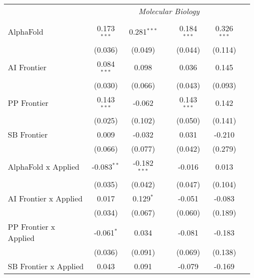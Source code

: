 \begin{tabular}{lcccccc}
 & \multicolumn{6}{c}{\textit{Molecular Biology}} \\ \\
   AlphaFold                      & 0.173$^{***}$ & 0.281$^{***}$  &                & 0.184$^{***}$ & 0.326$^{***}$ &   \\   
                                  & (0.036)       & (0.049)        &                & (0.044)       & (0.114)       &   \\   
   AI Frontier                    & 0.084$^{***}$ & 0.098          &                & 0.036         & 0.145         &   \\   
                                  & (0.030)       & (0.066)        &                & (0.043)       & (0.093)       &   \\   
   PP Frontier                    & 0.143$^{***}$ & -0.062         &                & 0.143$^{***}$ & 0.142         &   \\   
                                  & (0.025)       & (0.102)        &                & (0.050)       & (0.141)       &   \\   
   SB Frontier                    & 0.009         & -0.032         &                & 0.031         & -0.210        &   \\   
                                  & (0.066)       & (0.077)        &                & (0.042)       & (0.279)       &   \\   
   AlphaFold x Applied            & -0.083$^{**}$ & -0.182$^{***}$ &                & -0.016        & 0.013         &   \\   
                                  & (0.035)       & (0.042)        &                & (0.047)       & (0.104)       &   \\   
   AI Frontier x Applied          & 0.017         & 0.129$^{*}$    &                & -0.051        & -0.083        &   \\   
                                  & (0.034)       & (0.067)        &                & (0.060)       & (0.189)       &   \\   
   PP Frontier x Applied          & -0.061$^{*}$  & 0.034          &                & -0.081        & -0.183        &   \\   
                                  & (0.036)       & (0.091)        &                & (0.069)       & (0.138)       &   \\   
   SB Frontier x Applied          & 0.043         & 0.091          &                & -0.079        & -0.169        &   \\   

\end{tabular}
